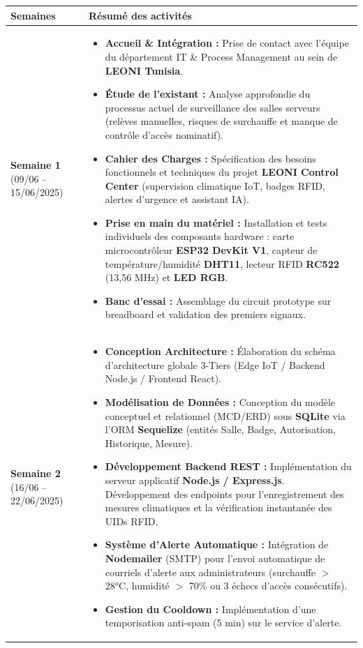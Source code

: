 \documentclass[11pt,a4paper]{article}
\begin{document}
\vspace{0.4cm}

\noindent
\begin{tabular}{|p{4.2cm}|p{12.8cm}|}
\hline
\centering \textbf{\Large Semaines} & \centering \textbf{\Large Résumé des activités} \tabularnewline
\hline
\textbf{\large Semaine 1} \newline \newline \small (09/06 -- 15/06/2025) 
& 
\begin{itemize}[leftmargin=*]
    \item \textbf{Accueil \& Intégration :} Prise de contact avec l'équipe du département IT \& Process Management au sein de \textbf{LEONI Tunisia}.
    \item \textbf{Étude de l'existant :} Analyse approfondie du processus actuel de surveillance des salles serveurs (relèves manuelles, risques de surchauffe et manque de contrôle d'accès nominatif).
    \item \textbf{Cahier des Charges :} Spécification des besoins fonctionnels et techniques du projet \textbf{LEONI Control Center} (supervision climatique IoT, badges RFID, alertes d'urgence et assistant IA).
    \item \textbf{Prise en main du matériel :} Installation et tests individuels des composants hardware : carte microcontrôleur \textbf{ESP32 DevKit V1}, capteur de température/humidité \textbf{DHT11}, lecteur RFID \textbf{RC522} (13,56 MHz) et \textbf{LED RGB}.
    \item \textbf{Banc d'essai :} Assemblage du circuit prototype sur breadboard et validation des premiers signaux.
\end{itemize}
\tabularnewline
\hline
\textbf{\large Semaine 2} \newline \newline \small (16/06 -- 22/06/2025)
& 
\begin{itemize}[leftmargin=*]
    \item \textbf{Conception Architecture :} Élaboration du schéma d'architecture globale 3-Tiers (Edge IoT / Backend Node.js / Frontend React).
    \item \textbf{Modélisation de Données :} Conception du modèle conceptuel et relationnel (MCD/ERD) sous \textbf{SQLite} via l'ORM \textbf{Sequelize} (entités Salle, Badge, Autorisation, Historique, Mesure).
    \item \textbf{Développement Backend REST :} Implémentation du serveur applicatif \textbf{Node.js / Express.js}. Développement des endpoints pour l'enregistrement des mesures climatiques et la vérification instantanée des UIDs RFID.
    \item \textbf{Système d'Alerte Automatique :} Intégration de \textbf{Nodemailer} (SMTP) pour l'envoi automatique de courriels d'alerte aux administrateurs (surchauffe $>$ 28°C, humidité $>$ 70\% ou 3 échecs d'accès consécutifs).
    \item \textbf{Gestion du Cooldown :} Implémentation d'une temporisation anti-spam (5 min) sur le service d'alerte.
\end{itemize}
\tabularnewline
\hline
\end{tabular}
\end{document}
